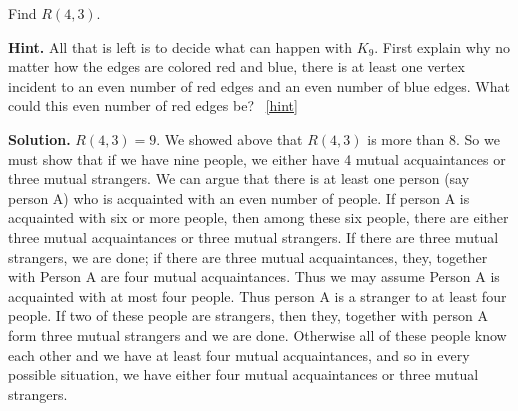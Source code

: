 \documentclass{book}
\begin{document}
\setcounter{project}{51}
\addtocounter{project}{-1}
\begin{activity}[]\label{activity-44}
\hypertarget{p-443}{}%
Find \(R(4,3)\).%
\par\smallskip%
\noindent\textbf{Hint.}\hypertarget{hint-21}{}\quad%
\hypertarget{p-444}{}%
All that is left is to decide what can happen with \(K_9\).  First explain why no matter how the edges are colored red and blue, there is at least one vertex incident to an even number of red edges and an even number of blue edges.  What could this even number of red edges be?%
~\hfill{\tiny\hyperlink{a-51}{[hint]}\hypertarget{q-51}{}}\par\smallskip%
\noindent\textbf{Solution.}\hypertarget{solution-48}{}\quad%
\hypertarget{p-445}{}%
\(R(4,3)=9\). We showed above that \(R(4,3)\) is more than 8. So we must show that if we have nine people, we either have 4 mutual acquaintances or three mutual strangers. We can argue that there is at least one person (say person A) who is acquainted with an even number of people. If person A is acquainted with six or more people, then among these six people, there are either three mutual acquaintances or three mutual strangers. If there are three mutual strangers, we are done; if there are three mutual acquaintances, they, together with Person A are four mutual acquaintances. Thus we may assume Person A is acquainted with at most four people. Thus person A is a stranger to at least four people. If two of these people are strangers, then they, together with person A form three mutual strangers and we are done. Otherwise all of these people know each other and we have at least four mutual acquaintances, and so in every possible situation, we have either four mutual acquaintances or three mutual strangers.%
\end{activity}
\end{document}
